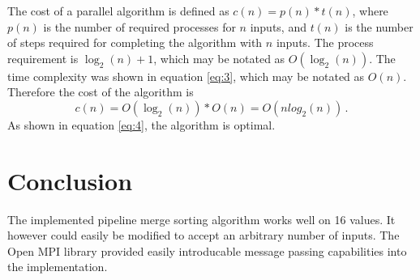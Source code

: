 \documentclass[pdftex, 11pt, a4paper, titlepage]{article}
\begin{document}
        The cost of a parallel algorithm is defined as $c(n) = p(n) * t(n)$, where $p(n)$ is the number of required processes for $n$
        inputs, and $t(n)$ is the number of steps required for completing the algorithm with $n$ inputs. The process requirement is
        $\log_{2}(n)+1$, which may be notated as $O(\log_{2}(n))$. The time complexity was shown in equation \ref{eq:3},
        which may be notated as $O(n)$. Therefore the cost of the algorithm is
        \begin{equation}\label{eq:4}
            c(n) = O(\log_{2}(n)) * O(n) = O(nlog_{2}(n))\,.
        \end{equation}
        As shown in equation \ref{eq:4}, the algorithm is optimal.

        \section{Conclusion}
        The implemented pipeline merge sorting algorithm works well on 16 values. It however could easily be modified to accept
        an arbitrary number of inputs. The Open MPI library provided easily introducable message passing capabilities into the
        implementation.
\end{document}
